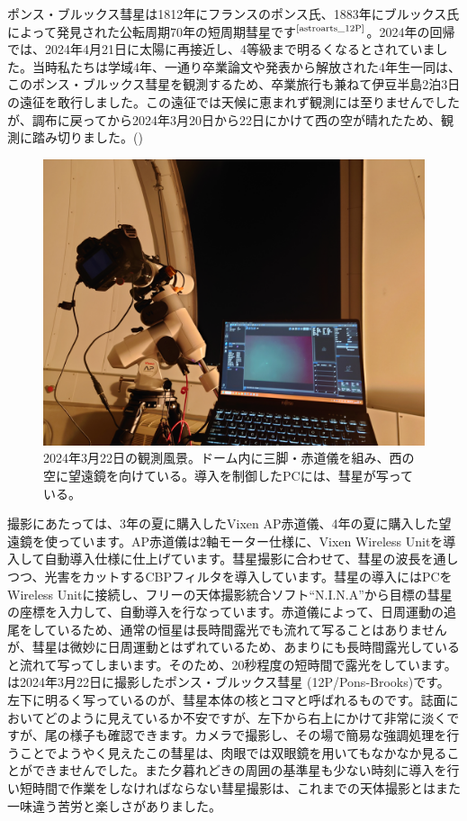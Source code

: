 \documentclass{supernova_pre}
\begin{document}
ポンス・ブルックス彗星は1812年にフランスのポンス氏、1883年にブルックス氏によって発見された公転周期70年の短周期彗星です$^\text{\cite{astroarts_12P}}$。2024年の回帰では、2024年4月21日に太陽に再接近し、4等級まで明るくなるとされていました。当時私たちは学域4年、一通り卒業論文や発表から解放された4年生一同は、このポンス・ブルックス彗星を観測するため、卒業旅行も兼ねて伊豆半島2泊3日の遠征を敢行しました。この遠征では天候に恵まれず観測には至りませんでしたが、調布に戻ってから2024年3月20日から22日にかけて西の空が晴れたため、観測に踏み切りました。()

\begin{figure}
    \centering
    \includegraphics[width=.8\columnwidth]{img/12P_shooting_image.JPG}
    \caption{2024年3月22日の観測風景。ドーム内に三脚・赤道儀を組み、西の空に望遠鏡を向けている。導入を制御したPCには、彗星が写っている。}
    \label{fig:Pons_Obs}
\end{figure}

撮影にあたっては、3年の夏に購入したVixen AP赤道儀、4年の夏に購入した望遠鏡を使っています。AP赤道儀は2軸モーター仕様に、Vixen Wireless Unitを導入して自動導入仕様に仕上げています。彗星撮影に合わせて、彗星の波長を通しつつ、光害をカットするCBPフィルタを導入しています。彗星の導入にはPCをWireless Unitに接続し、フリーの天体撮影統合ソフト``N.I.N.A''から目標の彗星の座標を入力して、自動導入を行なっています。赤道儀によって、日周運動の追尾をしているため、通常の恒星は長時間露光でも流れて写ることはありませんが、彗星は微妙に日周運動とはずれているため、あまりにも長時間露光していると流れて写ってしまいます。そのため、20秒程度の短時間で露光をしています。は2024年3月22日に撮影したポンス・ブルックス彗星 (12P/Pons-Brooks)です。
左下に明るく写っているのが、彗星本体の核とコマと呼ばれるものです。誌面においてどのように見えているか不安ですが、左下から右上にかけて非常に淡くですが、尾の様子も確認できます。カメラで撮影し、その場で簡易な強調処理を行うことでようやく見えたこの彗星は、肉眼では双眼鏡を用いてもなかなか見ることができませんでした。また夕暮れどきの周囲の基準星も少ない時刻に導入を行い短時間で作業をしなければならない彗星撮影は、これまでの天体撮影とはまた一味違う苦労と楽しさがありました。
\end{document}
